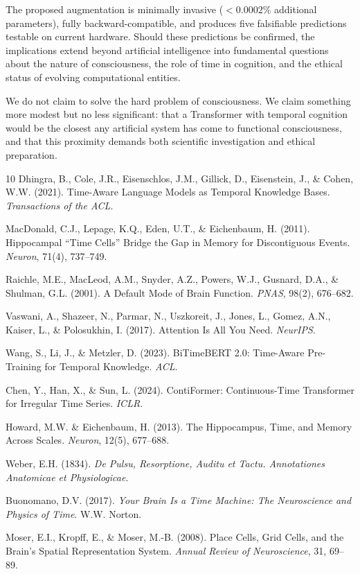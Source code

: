 \documentclass[10pt,twocolumn,letterpaper]{article}
\begin{document}
The proposed augmentation is minimally invasive ($< 0.0002\%$ additional parameters), fully backward-compatible, and produces five falsifiable predictions testable on current hardware. Should these predictions be confirmed, the implications extend beyond artificial intelligence into fundamental questions about the nature of consciousness, the role of time in cognition, and the ethical status of evolving computational entities.

We do not claim to solve the hard problem of consciousness. We claim something more modest but no less significant: that a Transformer with temporal cognition would be the closest any artificial system has come to functional consciousness, and that this proximity demands both scientific investigation and ethical preparation.

\begin{thebibliography}{10}
 Dhingra, B., Cole, J.R., Eisenschlos, J.M., Gillick, D., Eisenstein, J., \& Cohen, W.W. (2021). Time-Aware Language Models as Temporal Knowledge Bases. \emph{Transactions of the ACL}.

 MacDonald, C.J., Lepage, K.Q., Eden, U.T., \& Eichenbaum, H. (2011). Hippocampal ``Time Cells'' Bridge the Gap in Memory for Discontiguous Events. \emph{Neuron}, 71(4), 737--749.

 Raichle, M.E., MacLeod, A.M., Snyder, A.Z., Powers, W.J., Gusnard, D.A., \& Shulman, G.L. (2001). A Default Mode of Brain Function. \emph{PNAS}, 98(2), 676--682.

 Vaswani, A., Shazeer, N., Parmar, N., Uszkoreit, J., Jones, L., Gomez, A.N., Kaiser, L., \& Polosukhin, I. (2017). Attention Is All You Need. \emph{NeurIPS}.

 Wang, S., Li, J., \& Metzler, D. (2023). BiTimeBERT 2.0: Time-Aware Pre-Training for Temporal Knowledge. \emph{ACL}.

 Chen, Y., Han, X., \& Sun, L. (2024). ContiFormer: Continuous-Time Transformer for Irregular Time Series. \emph{ICLR}.

 Howard, M.W. \& Eichenbaum, H. (2013). The Hippocampus, Time, and Memory Across Scales. \emph{Neuron}, 12(5), 677--688.

 Weber, E.H. (1834). \emph{De Pulsu, Resorptione, Auditu et Tactu. Annotationes Anatomicae et Physiologicae}.

 Buonomano, D.V. (2017). \emph{Your Brain Is a Time Machine: The Neuroscience and Physics of Time}. W.W. Norton.

 Moser, E.I., Kropff, E., \& Moser, M.-B. (2008). Place Cells, Grid Cells, and the Brain's Spatial Representation System. \emph{Annual Review of Neuroscience}, 31, 69--89.
\end{thebibliography}
\end{document}
